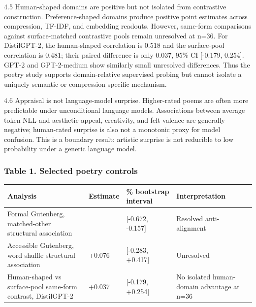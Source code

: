 \documentclass[
]{article}
\newcounter{none} %
\begin{document}
4.5 Human-shaped domains are positive but not isolated from contrastive
construction. Preference-shaped domains produce positive point estimates
across compression, TF-IDF, and embedding readouts. However, same-form
comparisons against surface-matched contrastive pools remain unresolved
at n=36. For DistilGPT-2, the human-shaped correlation is 0.518 and the
surface-pool correlation is 0.481; their paired difference is only
0.037, 95\% CI {[}-0.179, 0.254{]}. GPT-2 and GPT-2-medium show
similarly small unresolved differences. Thus the poetry study supports
domain-relative supervised probing but cannot isolate a uniquely
semantic or compression-specific mechanism.

4.6 Appraisal is not language-model surprise. Higher-rated poems are
often more predictable under unconditional language models. Associations
between average token NLL and aesthetic appeal, creativity, and felt
valence are generally negative; human-rated surprise is also not a
monotonic proxy for model confusion. This is a boundary result: artistic
surprise is not reducible to low probability under a generic language
model.

\subsubsection{Table 1. Selected poetry
controls}\label{table-1.-selected-poetry-controls}

{\def\LTcaptype{none} %
\begin{longtable}[]{@{}
  >{\raggedright\arraybackslash}p{}
  >{\raggedleft\arraybackslash}p{}
  >{\raggedleft\arraybackslash}p{}
  >{\raggedright\arraybackslash}p{}@{}}
\toprule\noalign{}
\begin{minipage}[b]{\linewidth}\raggedright
Analysis
\end{minipage} & \begin{minipage}[b]{\linewidth}\raggedleft
Estimate
\end{minipage} & \begin{minipage}[b]{\linewidth}\raggedleft
95\% bootstrap interval
\end{minipage} & \begin{minipage}[b]{\linewidth}\raggedright
Interpretation
\end{minipage} \\
\midrule\noalign{}
\endhead
\bottomrule\noalign{}
\endlastfoot
Formal Gutenberg, matched-other structural association & -0.443 &
{[}-0.672, -0.157{]} & Resolved anti-alignment \\
Accessible Gutenberg, word-shuffle structural association & +0.076 &
{[}-0.283, +0.417{]} & Unresolved \\
Human-shaped vs surface-pool same-form contrast, DistilGPT-2 & +0.037 &
{[}-0.179, +0.254{]} & No isolated human-domain advantage at n=36 \\
\end{longtable}
}
\end{document}
